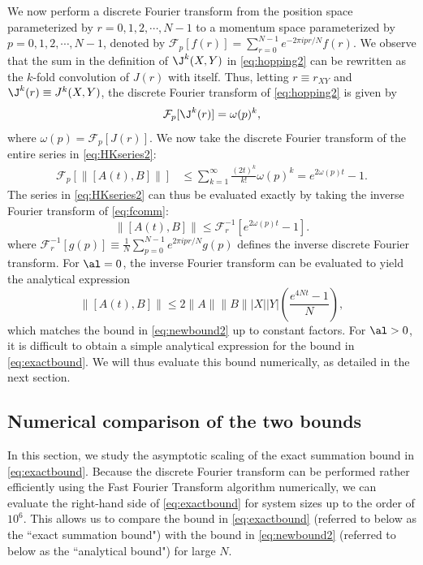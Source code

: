 We now perform a discrete Fourier transform from the position space parameterized by $r=0,1,2,\cdots,N-1$ to a momentum space parameterized by $p=0,1,2,\cdots,N-1$, denoted by $\mathcal{F}_p[f(r)]=\sum_{r=0}^{N-1}e^{-2\pi ipr/N}f(r)$.
We observe that the sum in the definition of $\J^k(X,Y)$ in \cref{eq:hopping2} can be rewritten as the $k$-fold convolution of $J(r)$ with itself.
Thus, letting $r\equiv r_{XY}$ and $\J^k(r) \equiv J^k(X,Y)$, the discrete Fourier transform of \cref{eq:hopping2} is given by
\begin{align}
	\mathcal{F}_p[\J^{k}(r)]  = \omega(p)^k,
\end{align}
where $\omega(p)=\mathcal{F}_p[J(r)]$.
We now take the discrete Fourier transform of the entire series in \cref{eq:HKseries2}:
\begin{align}
\mathcal{F}_p\left[	\|[A(t),B]\|\right] & \le\sum_{k=1}^{\infty}\frac{(2t)^{k}}{k!}\omega(p)^k = e^{2\omega(p)t}-1. \label{eq:fcomm}
\end{align}
The series in \cref{eq:HKseries2} can thus be evaluated exactly by taking the inverse Fourier transform of \cref{eq:fcomm}:
%
\begin{equation}
	\label{eq:exactbound}
		\|[A(t),B]\| \le \mathcal{F}_r^{-1}\left[e^{2\omega(p) t}-1\right].
\end{equation}
where $\mathcal{F}_r^{-1}[g(p)]\equiv\frac{1}{N}\sum_{p=0}^{N-1}e^{2\pi ipr/N}g(p)$ defines the inverse discrete Fourier transform.
For $\al = 0$, the inverse Fourier transform can be evaluated to yield the analytical expression \begin{equation}
    \|[A(t),B]\| \leq 2\|A\|\|B\||X||Y|\left(\frac{e^{4Nt}-1}{N}\right),
\end{equation}
which matches the bound in \cref{eq:newbound2} up to constant factors.
For $\al > 0$, it is difficult to obtain a simple analytical expression for the bound in \cref{eq:exactbound}. We will thus evaluate this bound numerically, as detailed in the next section.

\subsection{Numerical comparison of the two bounds}
\label{exactboundnumerics}

In this section, we study the asymptotic scaling of the exact summation bound in \cref{eq:exactbound}.
Because the discrete Fourier transform can be performed rather efficiently using the Fast Fourier Transform algorithm \cite{FFT65} numerically, we can evaluate the right-hand side of \cref{eq:exactbound} for system sizes up to the order of $10^6$.
This allows us to compare the bound in \cref{eq:exactbound} (referred to below as the ``exact summation bound") with the bound in \cref{eq:newbound2} (referred to below as the ``analytical bound") for large $N$.

